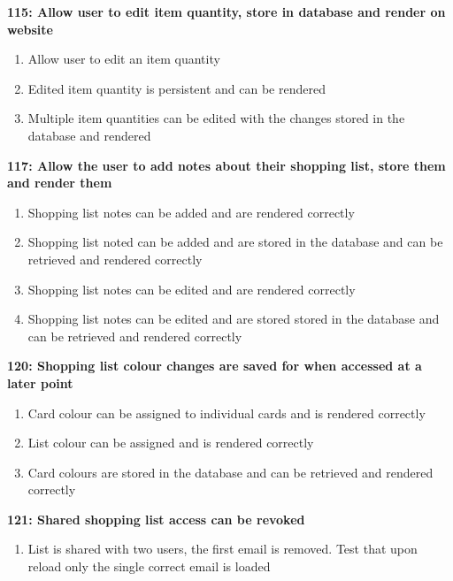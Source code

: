 \documentclass[10pt,onecolumn]{witseiepaper}
\begin{document}
\textbf{115: Allow user to edit item quantity, store in database and render on website}

\begin{enumerate}
	\item Allow user to edit an item quantity
	\item Edited item quantity is persistent and can be rendered
	\item Multiple item quantities can be edited with the changes stored in the database and rendered
\end{enumerate}

%

\textbf{117: Allow the user to add notes about their shopping list, store them and render them}

\begin{enumerate}
	\item Shopping list notes can be added and are rendered correctly
	\item Shopping list noted can be added and are stored in the database and can be retrieved and rendered correctly
	\item Shopping list notes can be edited and are rendered correctly
	\item Shopping list notes can be edited and are stored stored in the database and can be retrieved and rendered correctly
\end{enumerate}

\textbf{120: Shopping list colour changes are saved for when accessed at a later point}

\begin{enumerate}
\item Card colour can be assigned to individual cards and is rendered correctly
\item List colour can be assigned and is rendered correctly
\item Card colours are stored in the database and can be retrieved and rendered correctly
\end{enumerate}

\textbf{121: Shared shopping list access can be revoked}

\begin{enumerate}
	\item List is shared with two users, the first email is removed. Test that upon reload only the single correct email is loaded
\end{enumerate}
\end{document}

